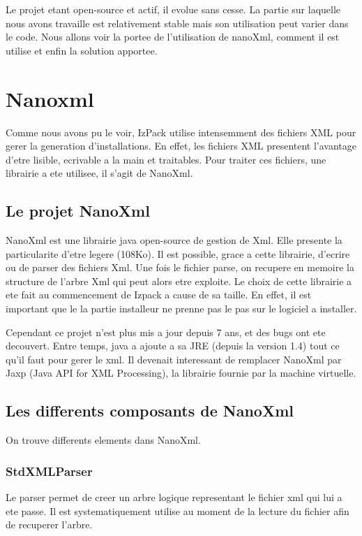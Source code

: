 Le projet etant open-source et actif, il evolue sans cesse. La partie sur laquelle nous avons travaille est relativement stable mais son utilisation peut varier dans le code. Nous allons voir la portee de l'utilisation de nanoXml, comment il est utilise et enfin la solution apportee.

\section{Nanoxml}
Comme nous avons pu le voir, IzPack utilise intensemment des fichiers XML pour gerer la generation d'installations. En effet, les fichiers XML presentent l'avantage d'etre lisible, ecrivable a la main et traitables. Pour traiter ces fichiers, une librairie a ete utilisee, il s'agit de NanoXml.
\subsection{Le projet NanoXml}
NanoXml est une librairie java open-source de gestion de Xml. Elle presente la particularite d'etre legere (108Ko). Il est possible, grace a cette librairie, d'ecrire ou de parser des fichiers Xml. Une fois le fichier parse, on recupere en memoire la structure de l'arbre Xml qui peut alors etre exploite. Le choix de cette librairie a ete fait au commencement de Izpack a cause de sa taille. En effet, il est important que le la partie installeur ne prenne pas le pas sur le logiciel a installer.

Cependant ce projet n'est plus mis a jour depuis 7 ans, et des bugs ont ete decouvert. Entre temps, java a ajoute a sa JRE (depuis la version 1.4) tout ce qu'il faut pour gerer le xml. Il devenait interessant de remplacer NanoXml par Jaxp (Java API for XML Processing), la librairie fournie par la machine virtuelle.
\subsection{Les differents composants de NanoXml}
On trouve differents elements dans NanoXml.
\subsubsection{StdXMLParser}
Le parser permet de creer un arbre logique representant le fichier xml qui lui a ete passe. Il est systematiquement utilise au moment de la lecture du fichier afin de recuperer l'arbre.
